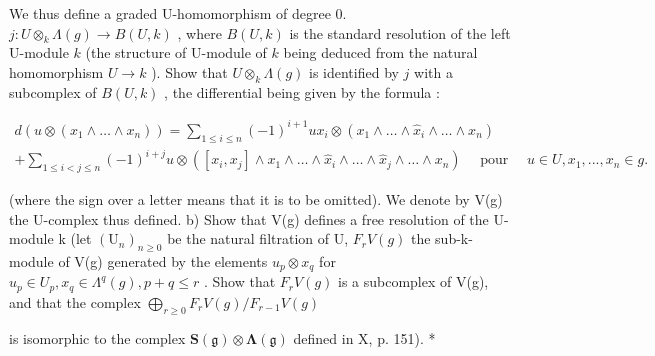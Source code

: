 We thus define a graded U-homomorphism of degree 0. \(j:U\otimes_{k}\Lambda(g)\to B(U,k)\) , where \(B(U,k)\) is the standard resolution of the left U-module \(k\) (the structure of U-module of \(k\) being deduced from the natural homomorphism \(U\to k\) ). Show that \(U\otimes_{k}\Lambda(g)\) is identified by \(j\) with a subcomplex of \(B(U,k)\) , the differential being given by the formula :

\[
\begin{array}{l} d (u \otimes (x _ {1} \wedge \dots \wedge x _ {n})) = \sum_ {1 \leqslant i \leqslant n} (- 1) ^ {i + 1} u x _ {i} \otimes (x _ {1} \wedge \dots \wedge \hat {x} _ {i} \wedge \dots \wedge x _ {n}) \\ + \sum_ {1 \leqslant i <   j \leqslant n} (- 1) ^ {i + j} u \otimes ([ x _ {i}, x _ {j} ] \wedge x _ {1} \wedge \dots \wedge \hat {x} _ {i} \wedge \dots \wedge \hat {x} _ {j} \wedge \dots \wedge x _ {n}) \quad \text { pour } \quad u \in U, x _ {1},..., x _ {n} \in g. \end{array}
\]

(where the sign over a letter means that it is to be omitted). We denote by V(g) the U-complex thus defined. b) Show that V(g) defines a free resolution of the U-module k (let \((\mathrm{U}_{n})_{n\geqslant0}\) be the natural filtration of U, \(F_{r}V(g)\) the sub-k-module of V(g) generated by the elements \(u_{p}\otimes x_{q}\) for \(u_{p}\in U_{p}, x_{q}\in\Lambda^{q}(g), p+q\leqslant r\) . Show that \(F_{r}V(g)\) is a subcomplex of V(g), and that the complex \(\bigoplus_{r\geqslant0}F_{r}V(g)/F_{r-1}V(g)\)

is isomorphic to the complex \(\mathbf{S}(\mathfrak{g})\otimes\symbf{\Lambda}(\mathfrak{g})\) defined in X, p. 151). *
